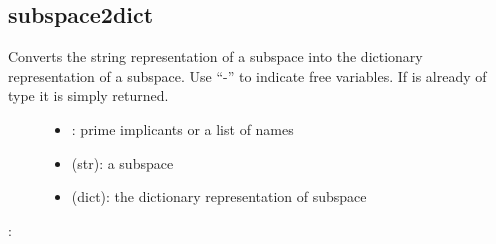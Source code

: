\documentclass[letterpaper,10pt,english]{sphinxmanual}
\begin{document}
\subsection{subspace2dict}
\label{\detokenize{StateTransitionGraphs:id12}}\label{\detokenize{StateTransitionGraphs:subspace2dict}}

\begin{fulllineitems}
\label{\detokenize{StateTransitionGraphs:PyBoolNet.StateTransitionGraphs.subspace2dict}}
Converts the string representation of a subspace into the dictionary representation of a subspace.
Use “-” to indicate free variables.
If  is already of type  it is simply returned.
\begin{description}
\item[{}] \leavevmode\begin{itemize}
\item {} 
: prime implicants or a list of names

\item {} 
 (str): a subspace

\end{itemize}

\item[{}] \leavevmode\begin{itemize}
\item {} 
 (dict): the dictionary representation of subspace

\end{itemize}

\end{description}

:

\begin{sphinxVerbatim}[commandchars=\\\{\}]
  
 
\end{sphinxVerbatim}

\end{fulllineitems}
\end{document}
